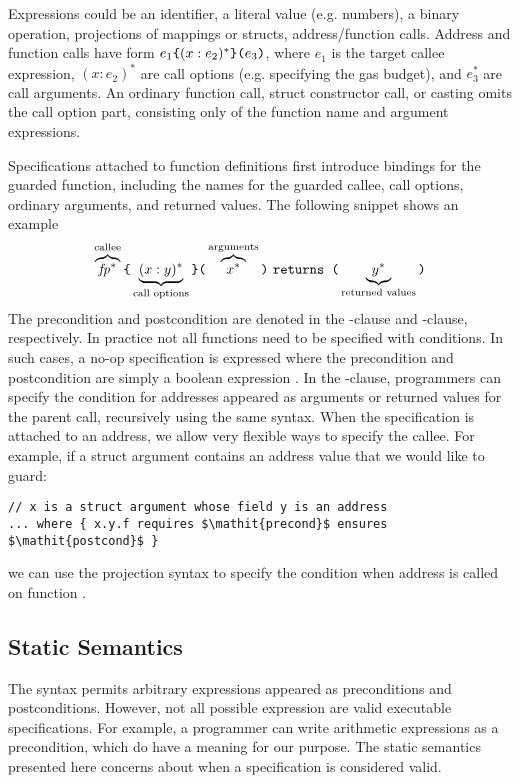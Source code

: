 Expressions could be an identifier, a literal value (e.g. numbers), a binary
operation, projections of mappings or structs, address/function calls.
Address and function calls have form ${e_1}\texttt{\{}{(x: e_2)^*}\texttt{\}(}{e_3}\texttt{)}$,
where $e_1$ is the target callee expression,
$(x: e_2)^*$ are call options (e.g. specifying the gas budget),
and $e_3^*$ are call arguments.
An ordinary function call, struct constructor call, or casting omits the call
option part, consisting only of the function name and argument expressions.

Specifications attached to function definitions first introduce bindings for
the guarded function, including the names for the guarded callee, call options,
ordinary arguments, and returned values. The following snippet shows an example
\[
  \overbrace{\mathit{fp^*}}^{\text{callee}}\texttt{\{}\underbrace{(x : y)^*}_{\text{call options}}\texttt{\}(}\overbrace{x^*}^{\text{arguments}}\texttt{)} ~\texttt{returns (}\underbrace{y^*}_{\text{returned values}}\texttt{)}
\]
The precondition and postcondition are denoted in the -clause and
-clause, respectively.
In practice not all functions need to be specified with conditions.
In such cases, a no-op specification is expressed where the precondition and
postcondition are simply a boolean expression .
In the -clause, programmers can specify the condition for addresses
appeared as arguments or returned values for the parent call, recursively using
the same syntax.
When the specification is attached to an address, we allow very flexible ways
to specify the callee. For example, if a struct argument contains an address
value that we would like to guard:
\begin{lstlisting}
// x is a struct argument whose field y is an address
... where { x.y.f requires $\mathit{precond}$ ensures $\mathit{postcond}$ }
\end{lstlisting}
we can use the projection syntax to specify
the condition when address  is called on function .

\subsection{Static Semantics}


The syntax permits arbitrary expressions appeared as preconditions and
postconditions.
However, not all possible expression are valid executable specifications.
For example, a programmer can write arithmetic expressions  as a precondition,
which do have a meaning for our purpose.
The static semantics presented here concerns about when a specification is
considered valid.

